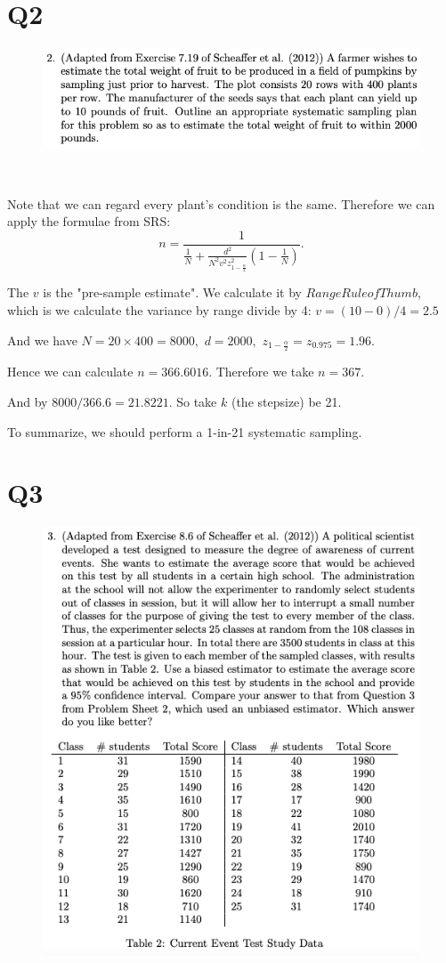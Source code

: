 \documentclass[12pt]{article}%
\begin{document}
\newpage
\section{Q2}
\begin{figure}[htp]
    \centering %
    \includegraphics[width = 15cm]{img/Q2.png}
\end{figure}

~\ 

Note that we can regard every plant's condition is the same. Therefore we can apply the 
formulae from SRS: $$n=\frac{1}{\frac{1}{N} + 
\frac{d^2}{N^2v^2z_{1-\frac{\alpha}{2}}^2}(1-\frac{1}{N})}.$$

The $v$ is the "pre-sample estimate". We calculate it by $Range Rule of Thumb$, which is 
we calculate the variance by range divide by 4: $v=(10-0)/4=2.5$

And we have $N=20\times 400 = 8000,$ $d=2000,$ $z_{1-\frac{\alpha}{2}}=z_{0.975}=1.96.$

Hence we can calculate $n=366.6016.$ Therefore we take $n=367.$

And by $8000/366.6=21.8221.$ So take $k$ (the stepsize) be 21. 

To summarize, we should perform a 1-in-21 systematic sampling.


\newpage
\section{Q3}
\begin{figure}[htp]
    \centering %
    \includegraphics[width = 15cm]{img/Q3.png}
\end{figure}

~\ 
\end{document}
